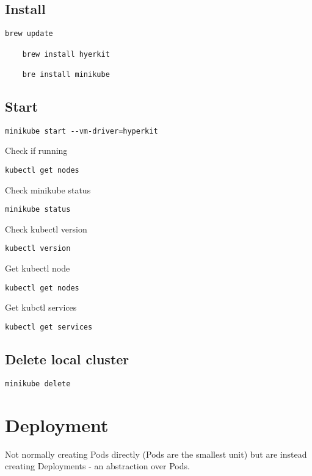 \subsection{Install}\label{subsec:install}
\begin{lstlisting}[label={lst:lstlisting}]
    brew update

    brew install hyerkit

    bre install minikube
\end{lstlisting}


\subsection{Start}\label{subsec:start}
\begin{lstlisting}[label={lst:lstlisting2}]
    minikube start --vm-driver=hyperkit
\end{lstlisting}

Check if running
\begin{lstlisting}[label={lst:lstlisting3}]
    kubectl get nodes
\end{lstlisting}

Check minikube status
\begin{lstlisting}[label={lst:lstlisting4}]
    minikube status
\end{lstlisting}

Check kubectl version
\begin{lstlisting}[label={lst:lstlisting5}]
    kubectl version
\end{lstlisting}

Get kubectl node
\begin{lstlisting}[label={lst:lstlisting6}]
    kubectl get nodes
\end{lstlisting}

Get kubctl services
\begin{lstlisting}[label={lst:lstlisting8}]
    kubectl get services
\end{lstlisting}

\subsection{Delete local cluster}\label{subsec:delete-local-cluster}
\begin{lstlisting}[label={lst:lstlisting7}]
    minikube delete
\end{lstlisting}

\section{Deployment}\label{sec:deployment}
Not normally creating Pods directly (Pods are the smallest unit) but are instead creating Deployments - an abstraction over Pods.


